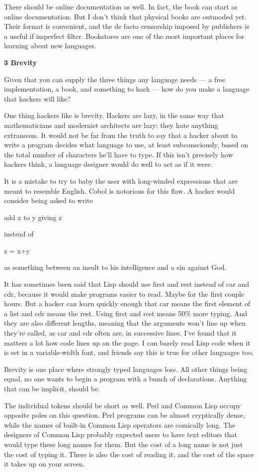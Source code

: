 There should be online documentation as well. In fact, the book can
start as online documentation. But I don't think that physical books are
outmoded yet. Their format is convenient, and the de facto censorship
imposed by publishers is a useful if imperfect filter. Bookstores are
one of the most important places for learning about new languages.

\textbf{3 Brevity}

Given that you can supply the three things any language needs --- a free
implementation, a book, and something to hack --- how do you make a
language that hackers will like?

One thing hackers like is brevity. Hackers are lazy, in the same way
that mathematicians and modernist architects are lazy: they hate
anything extraneous. It would not be far from the truth to say that a
hacker about to write a program decides what language to use, at least
subconsciously, based on the total number of characters he'll have to
type. If this isn't precisely how hackers think, a language designer
would do well to act as if it were.

It is a mistake to try to baby the user with long-winded expressions
that are meant to resemble English. Cobol is notorious for this flaw. A
hacker would consider being asked to write

add x to y giving z

instead of

z = x+y

as something between an insult to his intelligence and a sin against
God.

It has sometimes been said that Lisp should use first and rest instead
of car and cdr, because it would make programs easier to read. Maybe for
the first couple hours. But a hacker can learn quickly enough that car
means the first element of a list and cdr means the rest. Using first
and rest means 50\% more typing. And they are also different lengths,
meaning that the arguments won't line up when they're called, as car and
cdr often are, in successive lines. I've found that it matters a lot how
code lines up on the page. I can barely read Lisp code when it is set in
a variable-width font, and friends say this is true for other languages
too.

Brevity is one place where strongly typed languages lose. All other
things being equal, no one wants to begin a program with a bunch of
declarations. Anything that can be implicit, should be.

The individual tokens should be short as well. Perl and Common Lisp
occupy opposite poles on this question. Perl programs can be almost
cryptically dense, while the names of built-in Common Lisp operators are
comically long. The designers of Common Lisp probably expected users to
have text editors that would type these long names for them. But the
cost of a long name is not just the cost of typing it. There is also the
cost of reading it, and the cost of the space it takes up on your
screen.

